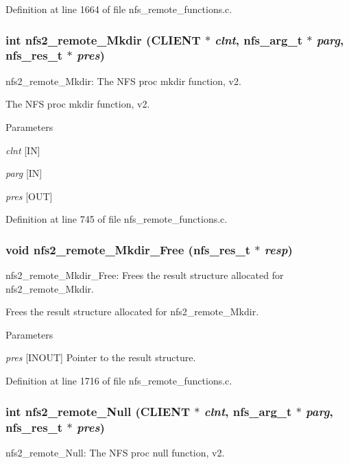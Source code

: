 Definition at line 1664 of file nfs\_\-remote\_\-functions.c.
\subsubsection[{nfs2\_\-remote\_\-Mkdir}]{\setlength{\rightskip}{0pt plus 5cm}int nfs2\_\-remote\_\-Mkdir (CLIENT $\ast$ {\em clnt}, \/  nfs\_\-arg\_\-t $\ast$ {\em parg}, \/  nfs\_\-res\_\-t $\ast$ {\em pres})}\label{group__NFSprocs_ga33df52a14e9fb3fada03f43c5ad25ae7}
nfs2\_\-remote\_\-Mkdir: The NFS proc mkdir function, v2.

The NFS proc mkdir function, v2.


\begin{DoxyParams}{Parameters}
\item[{\em clnt}][IN] \item[{\em parg}][IN] \item[{\em pres}][OUT] \end{DoxyParams}


Definition at line 745 of file nfs\_\-remote\_\-functions.c.
\subsubsection[{nfs2\_\-remote\_\-Mkdir\_\-Free}]{\setlength{\rightskip}{0pt plus 5cm}void nfs2\_\-remote\_\-Mkdir\_\-Free (nfs\_\-res\_\-t $\ast$ {\em resp})}\label{group__NFSprocs_gabadbd2dfbbbcfefe0ee1dbae5e094f4e}
nfs2\_\-remote\_\-Mkdir\_\-Free: Frees the result structure allocated for nfs2\_\-remote\_\-Mkdir.

Frees the result structure allocated for nfs2\_\-remote\_\-Mkdir.


\begin{DoxyParams}{Parameters}
\item[{\em pres}][INOUT] Pointer to the result structure. \end{DoxyParams}


Definition at line 1716 of file nfs\_\-remote\_\-functions.c.
\subsubsection[{nfs2\_\-remote\_\-Null}]{\setlength{\rightskip}{0pt plus 5cm}int nfs2\_\-remote\_\-Null (CLIENT $\ast$ {\em clnt}, \/  nfs\_\-arg\_\-t $\ast$ {\em parg}, \/  nfs\_\-res\_\-t $\ast$ {\em pres})}\label{group__NFSprocs_gaee0546d6aa6d2bc92b7ddd5df8929697}
nfs2\_\-remote\_\-Null: The NFS proc null function, v2.

